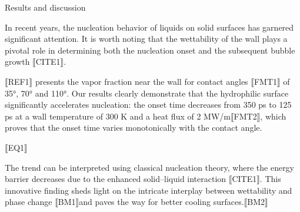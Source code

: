 Results and discussion

In recent years, the nucleation behavior of liquids on solid surfaces has garnered significant attention. It is worth noting that the wettability of the wall plays a pivotal role in determining both the nucleation onset and the subsequent bubble growth ⟦CITE1⟧.

⟦REF1⟧ presents the vapor fraction near the wall for contact angles ⟦FMT1⟧ of 35°, 70° and 110°. Our results clearly demonstrate that the hydrophilic surface significantly accelerates nucleation: the onset time decreases from 350 ps to 125 ps at a wall temperature of 300 K and a heat flux of 2 MW/m⟦FMT2⟧, which proves that the onset time varies monotonically with the contact angle.

⟦EQ1⟧

The trend can be interpreted using classical nucleation theory, where the energy barrier decreases due to the enhanced solid–liquid interaction ⟦CITE1⟧. This innovative finding sheds light on the intricate interplay between wettability and phase change ⟦BM1⟧and paves the way for better cooling surfaces.⟦BM2⟧